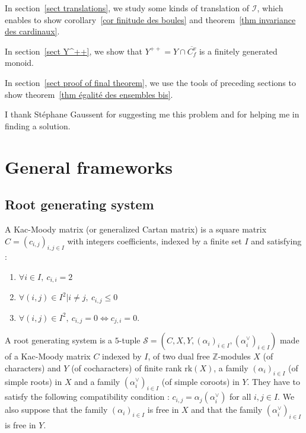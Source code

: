 \documentclass[12pt]{article}
\theoremstyle{plain}
\theoremstyle{definition}
\newcommand{\Z}{\mathbb{Z}}
\newcommand{\I}{\mathcal{I}}
\begin{document}
 In section~\ref{sect translations}, we study some kinds of translation of $\I$, which enables to show corollary~\ref{cor finitude des boules} and theorem~\ref{thm invariance des cardinaux}.
 
 In section~\ref{sect Y^++}, we show that $Y^{++}=Y\cap \overline{C_f^v}$ is a finitely generated monoid.
 
 In section~\ref{sect proof of final theorem}, we use the tools of preceding sections to show theorem~\ref{thm égalité des ensembles bis}. 

\vspace{3mm}

I thank Stéphane Gaussent for suggesting me this problem and for helping me in finding a solution.


\section{General frameworks}\label{sect general frameworks}
\subsection{Root generating system}
A Kac-Moody matrix (or generalized Cartan matrix) is a square matrix $C=(c_{i,j})_{i,j\in I}$ with integers coefficients, indexed by  a finite set $I$ and satisfying : 
\begin{enumerate}
\item $\forall i\in I,\ c_{i,i}=2$

\item $\forall (i,j)\in I^2|i \neq j,\ c_{i,j}\leq 0$

\item $\forall (i,j)\in I^2,\ c_{i,j}=0 \Leftrightarrow c_{j,i}=0$.
\end{enumerate}

A root generating system is a $5$-tuple $\mathcal{S}=(C,X,Y,(\alpha_i)_{i\in I},(\alpha_i^\vee)_{i\in I})$ made of a Kac-Moody matrix $C$ indexed by $I$, of two dual free $\Z$-modules $X$ (of characters) and $Y$ (of cocharacters) of finite rank $\mathrm{rk}(X)$, a family $(\alpha_i)_{i\in I}$ (of simple roots) in $X$ and a family $(\alpha_i^\vee)_{i\in I}$ (of simple coroots) in $Y$. They have to satisfy the following compatibility condition : $c_{i,j}=\alpha_j(\alpha_i^\vee)$ for all $i,j\in I$. We also suppose that the family $(\alpha_i)_{i\in I}$ is free in $X$ and that the family $(\alpha_i^\vee)_{i\in I}$ is free in $Y$.
\end{document}
